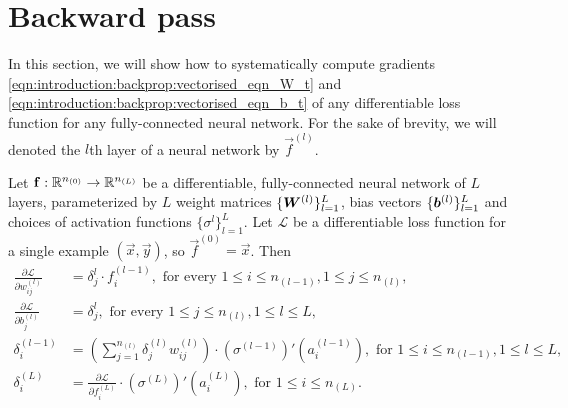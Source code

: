 \section{Backward pass}
In this section, we will show how to systematically compute gradients \ref{eqn:introduction:backprop:vectorised_eqn_W_t} and \ref{eqn:introduction:backprop:vectorised_eqn_b_t} of any differentiable loss function for any fully-connected neural network. For the sake of brevity, we will denoted the $l$th layer of a neural network by $\vec{f}^{(l)}$.
\begin{proposition}
\label{proposition:introduction:backward:naive}
Let $\mathbf{f} : {\mathbb R}^{n_{(0)}} \to {\mathbb R}^{n_{(L)}}$ be a differentiable, fully-connected neural network of $L$ layers, parameterized by $L$ weight matrices $\{ \bm{W}^{(l)}  \}_{l=1}^{L}$, bias vectors $\{  \bm{b}^{(l)} \}_{l=1}^{L}$ and choices of activation functions $\{ \sigma^{l} \}_{l=1}^{L}$.
Let $\mathcal{L}$ be a differentiable loss function for a single example $(\vec{x}, \vec{y})$, so $\vec{f}^{(0)} = \vec{x}$. Then
\begin{subequations}
\begin{align}
    \frac{\partial \mathcal{L}}{\partial w_{ij}^{(l)}} &= \delta_j^{l} \cdot f_{i}^{(l-1)}, \text{ for every $1 \leq i \leq n_{(l-1)}$}, 1 \leq j \leq n_{(l)},  \label{eqn:introduction:proposition:backward:naive:partial_L_partial_wij} \\
    \frac{\partial \mathcal{L}}{\partial b_{j}^{(l)}}  &= \delta_j^{l}, \text{ for every } 1 \leq j \leq n_{(l)}, 1 \leq l \leq L,  \label{eqn:introduction:proposition:backward:naive:partial_L_partial_b_j} \\
    \delta_i^{(l-1)} &= \left (\sum_{j=1}^{n_{(l)}}  \delta_j^{(l)} w_{ij}^{(l)} \right) \cdot \left(\sigma^{(l-1)}\right){'} ( a_{i}^{(l-1)}), \text{ for } 1 \leq i \leq n_{(l-1)},  1 \leq l \leq L,  \label{eqn:introduction:proposition:backward:naive:delta_l_minus_1}  \\ 
    \delta_i^{(L )} &= \frac{\partial \mathcal{L}}{\partial f_{i}^{(L)}} \cdot \left(\sigma^{(L)}\right){'} ( a_{i}^{(L)}), \text{ for } 1 \leq i \leq n_{(L)}. \label{eqn:introduction:proposition:backward:naive:delta_L}  
\end{align}
\end{subequations}
\end{proposition}
